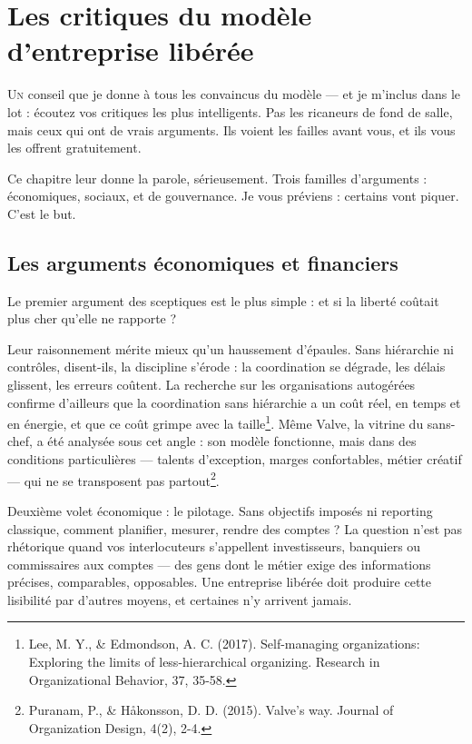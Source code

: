 
\chapter{Les critiques du modèle d'entreprise libérée}

\lettrine[lines=2]{U}{n} conseil que je donne à tous les convaincus du modèle — et je m'inclus dans le lot : écoutez vos critiques les plus intelligents. Pas les ricaneurs de fond de salle, mais ceux qui ont de vrais arguments. Ils voient les failles avant vous, et ils vous les offrent gratuitement.

Ce chapitre leur donne la parole, sérieusement. Trois familles d'arguments : économiques, sociaux, et de gouvernance. Je vous préviens : certains vont piquer. C'est le but.

\section{Les arguments économiques et financiers}

Le premier argument des sceptiques est le plus simple : et si la liberté coûtait plus cher qu'elle ne rapporte ?

Leur raisonnement mérite mieux qu'un haussement d'épaules. Sans hiérarchie ni contrôles, disent-ils, la discipline s'érode : la coordination se dégrade, les délais glissent, les erreurs coûtent. La recherche sur les organisations autogérées confirme d'ailleurs que la coordination sans hiérarchie a un coût réel, en temps et en énergie, et que ce coût grimpe avec la taille\footnote{Lee, M. Y., \& Edmondson, A. C. (2017). Self-managing organizations: Exploring the limits of less-hierarchical organizing. Research in Organizational Behavior, 37, 35-58.}. Même Valve, la vitrine du sans-chef, a été analysée sous cet angle : son modèle fonctionne, mais dans des conditions particulières — talents d'exception, marges confortables, métier créatif — qui ne se transposent pas partout\footnote{Puranam, P., \& Håkonsson, D. D. (2015). Valve's way. Journal of Organization Design, 4(2), 2-4.}.

Deuxième volet économique : le pilotage. Sans objectifs imposés ni reporting classique, comment planifier, mesurer, rendre des comptes ? La question n'est pas rhétorique quand vos interlocuteurs s'appellent investisseurs, banquiers ou commissaires aux comptes — des gens dont le métier exige des informations précises, comparables, opposables. Une entreprise libérée doit produire cette lisibilité par d'autres moyens, et certaines n'y arrivent jamais.

